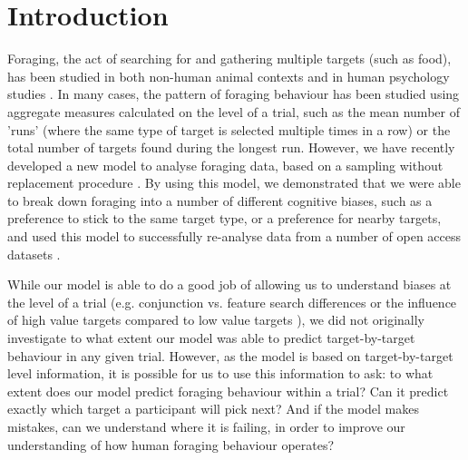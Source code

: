 \documentclass[vision,article,submit,pdftex,moreauthors]{Definitions/mdpi}
\begin{document}



\section{Introduction}

Foraging, the act of searching for and gathering multiple targets (such as food), has been studied in both non-human animal contexts \cite{dawkins1971} and in human psychology studies \cite{kristjansson2014}. In many cases, the pattern of foraging behaviour has been studied using aggregate measures calculated on the level of a trial, such as the mean number of 'runs' (where the same type of target is selected multiple times in a row) or the total number of targets found during the longest run. However, we have recently developed a new model to analyse foraging data, based on a sampling without replacement procedure \cite{clarke2022}. By using this model, we demonstrated that we were able to break down foraging into a number of different cognitive biases, such as a preference to stick to the same target type, or a preference for nearby targets, and used this model to successfully re-analyse data from a number of open access datasets \cite{kristjansson2014, thornton2020, clarke2022, tagu2020}. 

While our model is able to do a good job of allowing us to understand biases at the level of a trial (e.g. conjunction vs. feature search differences \cite{kristjansson2014} or the influence of high value targets compared to low value targets \cite{tagu2020}), we did not originally investigate to what extent our model was able to predict target-by-target behaviour in any given trial. However, as the model is based on target-by-target level information, it is possible for us to use this information to ask: to what extent does our model predict foraging behaviour within a trial? Can it predict exactly which target a participant will pick next? And if the model makes mistakes, can we understand where it is failing, in order to improve our understanding of how human foraging behaviour operates?
\end{document}
